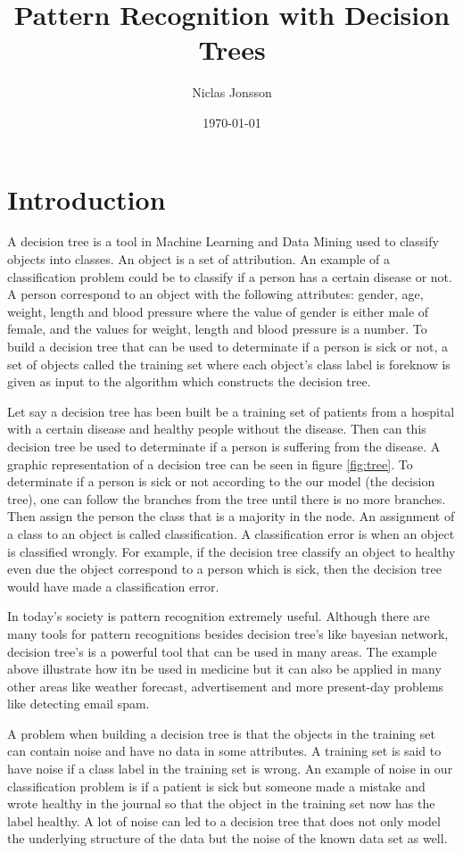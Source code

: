 \documentclass{article}
\title{Pattern Recognition with Decision Trees}
\author{Niclas Jonsson}
\date{\today}
\begin{document}
\maketitle
\section{Introduction}
A decision tree is a tool in Machine Learning and Data Mining used to classify objects into classes\cite{Quinlan1986InductionTrees}. An object is a set of attribution. An example of a classification problem could be to classify if a person has a certain disease or not. A person correspond to an object with the following attributes: gender, age, weight, length and blood pressure where the value of gender is either male of female, and the values for weight, length and blood pressure is a number. To build a decision tree that can be used to determinate if a person is sick or not, a set of objects called the training set where each object's class label is foreknow is given as input to the algorithm which constructs the decision tree\cite{Loh2011ClassificationTrees}.

Let say a decision tree has been built be a training set of patients from a hospital with a certain disease and healthy people without the disease.
Then can this decision tree be used to determinate if a person is suffering from the disease. A graphic representation of a decision tree can be seen in figure \ref{fig:tree}. To determinate if a person is sick or not according to the our model (the decision tree), one can follow the branches from the tree until there is no more branches. Then assign the person the class that is a majority in the node. An assignment of a class to an object is called classification. A classification error is when an object is classified wrongly. For example, if the decision tree classify an object to healthy even due the object correspond to a person which is sick, then the decision tree would have made a classification error.

In today's society is pattern recognition extremely useful. Although there are many tools for pattern recognitions besides decision tree's like bayesian network, decision tree's is a powerful tool that can be used in many areas. The example above illustrate how itn be used in medicine but it can also be applied in many other areas like weather forecast, advertisement and more present-day problems like detecting email spam.

A problem when building a decision tree is that the objects in the training set can contain noise and have no data in some attributes. 
A training set is said to have noise  if a class label in the training set is wrong\cite{Feelders2000MethodologicalMining}. An example of noise in our classification problem is if a patient is sick but someone made a mistake and wrote healthy in the journal so that the object in the training set now has the label healthy. A lot of noise can led to a decision tree that does not only model the underlying structure of the data but the noise of the known data set as well. 
\end{document}
